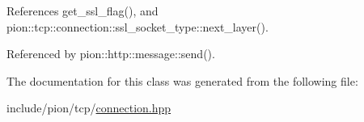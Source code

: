 References get\-\_\-ssl\-\_\-flag(), and pion\-::tcp\-::connection\-::ssl\-\_\-socket\-\_\-type\-::next\-\_\-layer().



Referenced by pion\-::http\-::message\-::send().



The documentation for this class was generated from the following file\-:\begin{DoxyCompactItemize}
\item 
include/pion/tcp/\hyperlink{connection_8hpp}{connection.\-hpp}\end{DoxyCompactItemize}
